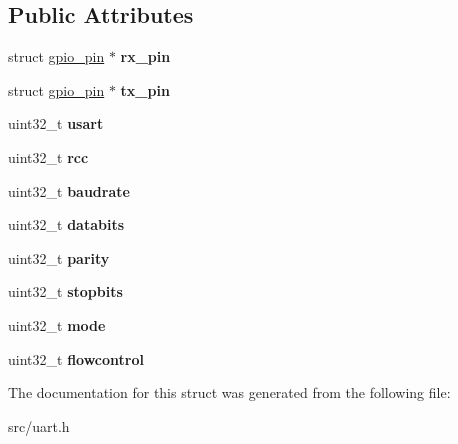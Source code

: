 \subsection*{Public Attributes}
\begin{DoxyCompactItemize}
\item 
\hypertarget{structusart__config_afb0c0a9281bba234d1b7282fd5661826}{}struct \hyperlink{structgpio__pin}{gpio\+\_\+pin} $\ast$ {\bfseries rx\+\_\+pin}\label{structusart__config_afb0c0a9281bba234d1b7282fd5661826}

\item 
\hypertarget{structusart__config_acda049cae41a8261b02b52ef76830941}{}struct \hyperlink{structgpio__pin}{gpio\+\_\+pin} $\ast$ {\bfseries tx\+\_\+pin}\label{structusart__config_acda049cae41a8261b02b52ef76830941}

\item 
\hypertarget{structusart__config_a7057d1e4e59d4cb6f002cace870fa34b}{}uint32\+\_\+t {\bfseries usart}\label{structusart__config_a7057d1e4e59d4cb6f002cace870fa34b}

\item 
\hypertarget{structusart__config_a5362ef6b4daf5a9e2722c9c4e167e9ed}{}uint32\+\_\+t {\bfseries rcc}\label{structusart__config_a5362ef6b4daf5a9e2722c9c4e167e9ed}

\item 
\hypertarget{structusart__config_acacbd7ecb3d46f576ff1361ae40019fd}{}uint32\+\_\+t {\bfseries baudrate}\label{structusart__config_acacbd7ecb3d46f576ff1361ae40019fd}

\item 
\hypertarget{structusart__config_a688b390f173cc710c95227d84a8f0771}{}uint32\+\_\+t {\bfseries databits}\label{structusart__config_a688b390f173cc710c95227d84a8f0771}

\item 
\hypertarget{structusart__config_a69189444320b793047313d2e80c9df6b}{}uint32\+\_\+t {\bfseries parity}\label{structusart__config_a69189444320b793047313d2e80c9df6b}

\item 
\hypertarget{structusart__config_a5d944fbbe5a88c9a2f2d60df6a092f69}{}uint32\+\_\+t {\bfseries stopbits}\label{structusart__config_a5d944fbbe5a88c9a2f2d60df6a092f69}

\item 
\hypertarget{structusart__config_afaf14d61e3be8a4d3208a1acb68967d4}{}uint32\+\_\+t {\bfseries mode}\label{structusart__config_afaf14d61e3be8a4d3208a1acb68967d4}

\item 
\hypertarget{structusart__config_aef2d53d38b3b8b974a5e3355061f9ec8}{}uint32\+\_\+t {\bfseries flowcontrol}\label{structusart__config_aef2d53d38b3b8b974a5e3355061f9ec8}

\end{DoxyCompactItemize}


The documentation for this struct was generated from the following file\+:\begin{DoxyCompactItemize}
\item 
src/uart.\+h\end{DoxyCompactItemize}
